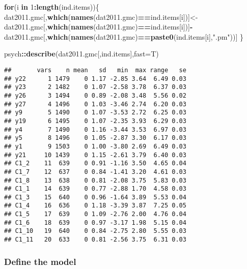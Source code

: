 \documentclass[
]{article}
\newenvironment{Shaded}{\begin{snugshade}}{\end{snugshade}}
\newcommand{\ControlFlowTok}[1]{\textcolor[rgb]{0.13,0.29,0.53}{\textbf{#1}}}
\newcommand{\DataTypeTok}[1]{\textcolor[rgb]{0.13,0.29,0.53}{#1}}
\newcommand{\DecValTok}[1]{\textcolor[rgb]{0.00,0.00,0.81}{#1}}
\newcommand{\KeywordTok}[1]{\textcolor[rgb]{0.13,0.29,0.53}{\textbf{#1}}}
\newcommand{\NormalTok}[1]{#1}
\newcommand{\OperatorTok}[1]{\textcolor[rgb]{0.81,0.36,0.00}{\textbf{#1}}}
\newcommand{\StringTok}[1]{\textcolor[rgb]{0.31,0.60,0.02}{#1}}
\begin{document}
\begin{Shaded}
\begin{Highlighting}[]
\ControlFlowTok{for}\NormalTok{(i }\ControlFlowTok{in} \DecValTok{1}\OperatorTok{:}\KeywordTok{length}\NormalTok{(ind.items))\{}
\NormalTok{  dat2011.gmc[,}\KeywordTok{which}\NormalTok{(}\KeywordTok{names}\NormalTok{(dat2011.gmc)}\OperatorTok{==}\NormalTok{ind.items[i])]<-}
\StringTok{    }\NormalTok{dat2011.gmc[,}\KeywordTok{which}\NormalTok{(}\KeywordTok{names}\NormalTok{(dat2011.gmc)}\OperatorTok{==}\NormalTok{ind.items[i])]}\OperatorTok{-}
\StringTok{    }\NormalTok{dat2011.gmc[,}\KeywordTok{which}\NormalTok{(}\KeywordTok{names}\NormalTok{(dat2011.gmc)}\OperatorTok{==}\KeywordTok{paste0}\NormalTok{(ind.items[i],}\StringTok{".pm"}\NormalTok{))]}
\NormalTok{\}}


\NormalTok{psych}\OperatorTok{::}\KeywordTok{describe}\NormalTok{(dat2011.gmc[,ind.items],}\DataTypeTok{fast=}\NormalTok{T)}
\end{Highlighting}
\end{Shaded}

\begin{verbatim}
##       vars    n mean   sd   min  max range   se
## y22      1 1479    0 1.17 -2.85 3.64  6.49 0.03
## y23      2 1482    0 1.07 -2.58 3.78  6.37 0.03
## y26      3 1494    0 0.89 -2.08 3.48  5.56 0.02
## y27      4 1496    0 1.03 -3.46 2.74  6.20 0.03
## y9       5 1490    0 1.07 -3.53 2.72  6.25 0.03
## y19      6 1495    0 1.07 -2.35 3.93  6.29 0.03
## y4       7 1490    0 1.16 -3.44 3.53  6.97 0.03
## y5       8 1496    0 1.05 -2.87 3.30  6.17 0.03
## y1       9 1503    0 1.00 -3.80 2.69  6.49 0.03
## y21     10 1439    0 1.15 -2.61 3.79  6.40 0.03
## C1_2    11  639    0 0.91 -1.16 3.50  4.65 0.04
## C1_7    12  637    0 0.84 -1.41 3.20  4.61 0.03
## C1_8    13  638    0 0.81 -2.08 3.75  5.83 0.03
## C1_1    14  639    0 0.77 -2.88 1.70  4.58 0.03
## C1_3    15  640    0 0.96 -1.64 3.89  5.53 0.04
## C1_4    16  636    0 1.18 -3.39 3.87  7.25 0.05
## C1_5    17  639    0 1.09 -2.76 2.00  4.76 0.04
## C1_6    18  639    0 0.97 -3.17 1.98  5.15 0.04
## C1_10   19  640    0 0.84 -2.75 2.80  5.55 0.03
## C1_11   20  633    0 0.81 -2.56 3.75  6.31 0.03
\end{verbatim}

\hypertarget{define-the-model-2}{%
\subsubsection{Define the model}\label{define-the-model-2}}
\end{document}
